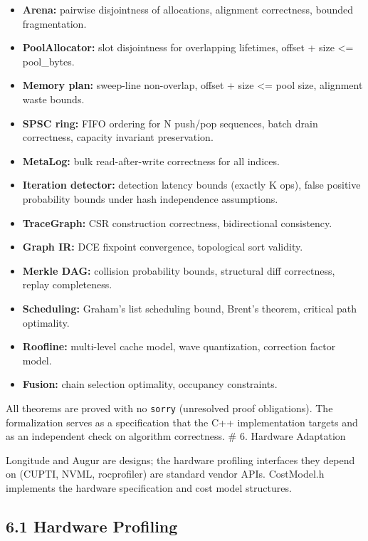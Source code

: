 \begin{itemize}
\tightlist
\item
  \textbf{Arena:} pairwise disjointness of allocations, alignment correctness, bounded fragmentation.
\item
  \textbf{PoolAllocator:} slot disjointness for overlapping lifetimes, offset + size \textless= pool\_bytes.
\item
  \textbf{Memory plan:} sweep-line non-overlap, offset + size \textless= pool size, alignment waste bounds.
\item
  \textbf{SPSC ring:} FIFO ordering for N push/pop sequences, batch drain correctness, capacity invariant preservation.
\item
  \textbf{MetaLog:} bulk read-after-write correctness for all indices.
\item
  \textbf{Iteration detector:} detection latency bounds (exactly K ops), false positive probability bounds under hash independence assumptions.
\item
  \textbf{TraceGraph:} CSR construction correctness, bidirectional consistency.
\item
  \textbf{Graph IR:} DCE fixpoint convergence, topological sort validity.
\item
  \textbf{Merkle DAG:} collision probability bounds, structural diff correctness, replay completeness.
\item
  \textbf{Scheduling:} Graham's list scheduling bound, Brent's theorem, critical path optimality.
\item
  \textbf{Roofline:} multi-level cache model, wave quantization, correction factor model.
\item
  \textbf{Fusion:} chain selection optimality, occupancy constraints.
\end{itemize}

All theorems are proved with no \texttt{sorry} (unresolved proof obligations). The formalization serves as a specification that the C++ implementation targets and as an independent check on algorithm correctness.
\# 6. Hardware Adaptation

Longitude and Augur are designs; the hardware profiling interfaces they depend on (CUPTI, NVML, rocprofiler) are standard vendor APIs. CostModel.h implements the hardware specification and cost model structures.

\subsection{6.1 Hardware Profiling}\label{hardware-profiling}

